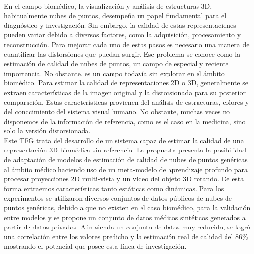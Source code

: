 \chapter*{}


% 


\thispagestyle{empty}

\begin{center}
{\large\bfseries \myTitle}\\
\end{center}
\begin{center}
\myName\\
\end{center}

\\

\\
En el campo biomédico, la visualización y análisis de estructuras 3D, 
habitualmente nubes de puntos, desempeña un papel fundamental para el diagnóstico y investigación. 
Sin embargo, la calidad de estas representaciones pueden variar debido a diversos factores, como la adquisición, procesamiento y reconstrucción. 
Para mejorar cada uno de estos pasos es necesario una manera de cuantificar las distorsiones que puedan surgir. 
Ese problema se conoce como la estimación de calidad de nubes de puntos, 
un campo de especial y reciente importancia. No obstante, 
es un campo todavía sin explorar en el ámbito biomédico.
Para estimar la calidad de representaciones 2D o 3D, generalmente se extraen características de la imagen original y la distorsionada para su posterior 
comparación. Estas características provienen del análisis de estructuras, colores y 
del conocimiento del sistema visual humano. No obstante, 
muchas veces no disponemos de la información de referencia, como es el caso en 
la medicina, sino solo la versión distorsionada.
\\

Este TFG trata del desarrollo de un sistema capaz de estimar la calidad de 
una representación 3D biomédica sin referencia. La propuesta presenta la posibilidad de 
adaptación de modelos de estimación de calidad de nubes de puntos genéricas 
al ámbito médico haciendo uso de un meta-modelo de aprendizaje profundo para 
procesar proyecciones 2D multi-vista y un vídeo del objeto 3D rotando. 
De esta forma extraemos características tanto estáticas como dinámicas.
Para los experimentos se utilizaron diversos conjuntos de datos públicos 
de nubes de puntos genéricas, debido a que no existen en el caso biomédico, 
para la validación entre modelos y se propone un conjunto de datos médicos 
sintéticos generados a partir de datos privados. Aún siendo un conjunto de datos 
muy reducido, se logró una correlación entre los valores predicho y la 
estimación real de calidad del 86\% mostrando el potencial que posee esta línea de investigación.

